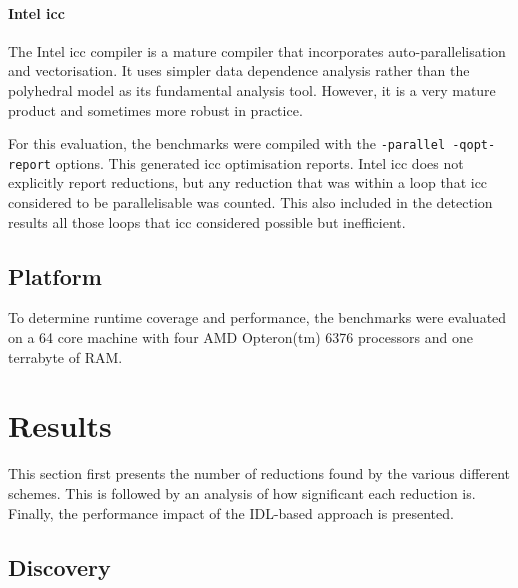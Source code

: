 \paragraph*{Intel icc}

    The Intel icc compiler is a mature compiler that incorporates
    auto-parallelisation and vectorisation.
    It uses simpler data dependence analysis rather than the polyhedral model as
    its fundamental analysis tool.
    However, it is a very mature product and sometimes more robust in practice.

    For this evaluation, the benchmarks were compiled with the
    \texttt{-parallel -qopt-report} options.
    This generated icc optimisation reports.
    Intel icc does not explicitly report reductions, but any reduction that was
    within a loop that icc considered to be parallelisable was counted.
    This also included in the detection results all those loops that icc
    considered possible but inefficient.

\subsection{Platform}

    To determine runtime coverage and performance, the benchmarks were evaluated
    on a 64 core machine with four AMD Opteron(tm) 6376 processors and one
    terrabyte of RAM.

\newpage
\section{Results}


    This section first presents the number of reductions found by the various
    different schemes.
    This is followed by an analysis of how significant each reduction is.
    Finally, the performance impact of the IDL-based approach is presented.
       
\subsection{Discovery}

